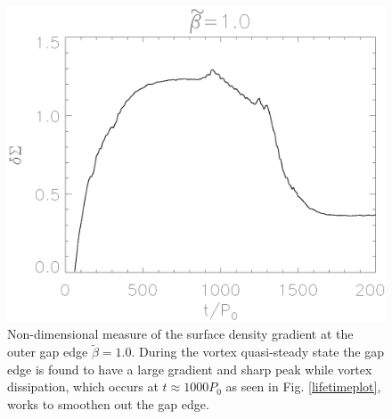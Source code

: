
\begin{figure}
  \includegraphics[width=\linewidth]{figures/gap_smoothness}
  \caption{Non-dimensional measure of the surface density gradient at
    the outer gap edge $\tilde\beta=1.0$. During the vortex quasi-steady state
    the gap edge is found to have a large gradient and sharp peak while vortex
    dissipation,
    which occurs at $t\approx1000P_0$ as seen in Fig. \ref{lifetimeplot},
    works to smoothen out the gap edge.
    \label{smoothnessplot}}  
\end{figure}





